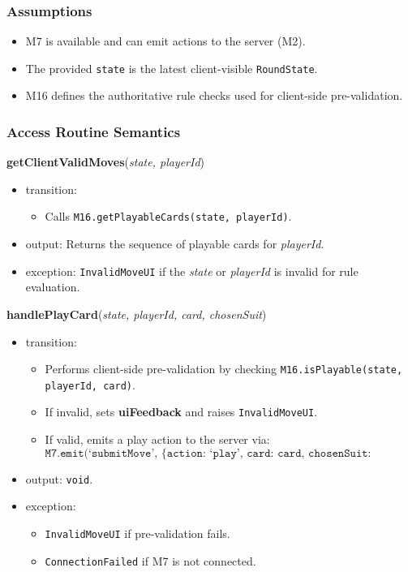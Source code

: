\documentclass[12pt, titlepage]{article}
\begin{document}
\subsubsection{Assumptions}
\begin{itemize}
    \item M7 is available and can emit actions to the server (M2).
    \item The provided \texttt{state} is the latest client-visible \texttt{RoundState}.
    \item M16 defines the authoritative rule checks used for client-side pre-validation.
\end{itemize}

\subsubsection{Access Routine Semantics}

\noindent\textbf{getClientValidMoves}(\textit{state, playerId})
\begin{itemize}
    \item transition:
    \begin{itemize}
        \item Calls \texttt{M16.getPlayableCards(state, playerId)}.
    \end{itemize}
    \item output: Returns the sequence of playable cards for \textit{playerId}.
    \item exception: \texttt{InvalidMoveUI} if the \textit{state} or \textit{playerId} is invalid for rule evaluation.
\end{itemize}

\noindent\textbf{handlePlayCard}(\textit{state, playerId, card, chosenSuit})
\begin{itemize}
    \item transition:
    \begin{itemize}
        \item Performs client-side pre-validation by checking \texttt{M16.isPlayable(state, playerId, card)}.
        \item If invalid, sets \textbf{uiFeedback} and raises \texttt{InvalidMoveUI}.
        \item If valid, emits a play action to the server via:
        \[
            \texttt{M7.emit(`submitMove', \{action: `play', card: card, chosenSuit: chosenSuit\})}
        \]
    \end{itemize}
    \item output: \texttt{void}.
    \item exception:
    \begin{itemize}
        \item \texttt{InvalidMoveUI} if pre-validation fails.
        \item \texttt{ConnectionFailed} if M7 is not connected.
    \end{itemize}
\end{itemize}
\end{document}
